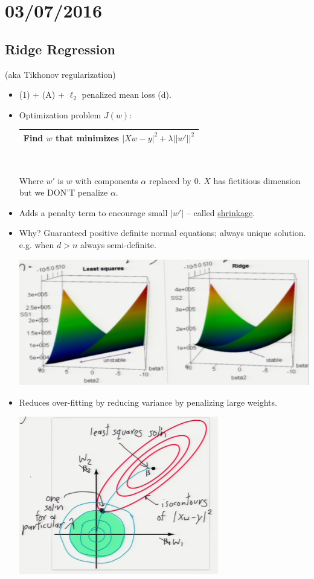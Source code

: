 \documentclass[10pt]{article}
\begin{document}
\section*{03/07/2016}
	\subsection*{Ridge Regression} (aka Tikhonov regularization)
	\
	\begin{itemize}
		\item (1) + (A) + $\ell_{2}$ penalized mean loss (d).
		\item Optimization problem $J(w)$:
		\begin{center}
			\begin{tabular}{|c|}
				\hline
				Find $w$ that minimizes
				$|Xw - y|^{2} + \lambda||w'||^{2}$\\
				\hline
			\end{tabular}\\
		\end{center}
		Where $w'$ is $w$ with components $\alpha$ replaced by 0. $X$ has fictitious dimension but we DON'T penalize $\alpha$.
		\item Adds a penalty term to encourage small $|w'|$ -- called \underline{shrinkage}.
		\item Why? Guaranteed positive definite normal equations; always unique solution. e.g. when $d>n$ always semi-definite.
			\begin{center}
				\includegraphics[scale=0.5]{../images/ridge}
			\end{center}
		\item Reduces over-fitting by reducing variance by penalizing large weights.
			\begin{center}
				\includegraphics[scale=0.5]{../images/sqrsvslambda}

\end{center}
\end{itemize}
\end{document}
